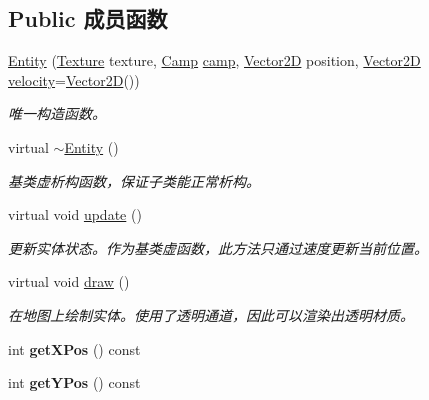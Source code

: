 \subsection*{Public 成员函数}
\begin{DoxyCompactItemize}
\item 
\hyperlink{class_entity_a604327e36e9783d29dd6ae6e4626777a}{Entity} (\hyperlink{struct_texture}{Texture} texture, \hyperlink{_entity_8h_ad54c4fe39f1c51b786c24ae0b7763b44}{Camp} \hyperlink{class_entity_a5326accd49d3817310ec90692b9da3df}{camp}, \hyperlink{structbasic__vector2_d}{Vector2D} position, \hyperlink{structbasic__vector2_d}{Vector2D} \hyperlink{class_entity_a386d25b56772b8913eb3e5adc636f6e0}{velocity}=\hyperlink{structbasic__vector2_d}{Vector2D}())
\begin{DoxyCompactList}\small\item\em 唯一构造函数。 \end{DoxyCompactList}\item 
virtual \hyperlink{class_entity_a588098978eea6a3486b7361605ff3f0f}{$\sim$\+Entity} ()
\begin{DoxyCompactList}\small\item\em 基类虚析构函数，保证子类能正常析构。 \end{DoxyCompactList}\item 
virtual void \hyperlink{class_entity_a00b6eeaf99b35c8f8b10b5fbfc1baf4f}{update} ()
\begin{DoxyCompactList}\small\item\em 更新实体状态。作为基类虚函数，此方法只通过速度更新当前位置。 \end{DoxyCompactList}\item 
virtual void \hyperlink{class_entity_a7666f416dd0d1fce0f1133f78df44476}{draw} ()
\begin{DoxyCompactList}\small\item\em 在地图上绘制实体。使用了透明通道，因此可以渲染出透明材质。 \end{DoxyCompactList}\item 
\mbox{\label{class_entity_ac704e83937d21eb280bf0618c27e2e66}} 
int {\bfseries get\+X\+Pos} () const
\item 
\mbox{\label{class_entity_a8dc5891871faff09d565738104e1d42f}} 
int {\bfseries get\+Y\+Pos} () const
\item 
\mbox{\label{class_entity_a8afb8aa252cbbffecc2dff0669cb2896}} 

\end{DoxyCompactItemize}
